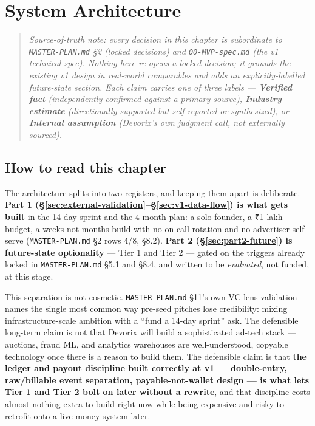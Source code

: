 \chapter{System Architecture}
\label{chap:system-architecture}

\begin{quote}
\textit{Source-of-truth note: every decision in this chapter is subordinate to \texttt{MASTER-PLAN.md} \S2 (locked decisions) and \texttt{00-MVP-spec.md} (the v1 technical spec). Nothing here re-opens a locked decision; it grounds the existing v1 design in real-world comparables and adds an explicitly-labelled future-state section. Each claim carries one of three labels --- \textbf{Verified fact} (independently confirmed against a primary source), \textbf{Industry estimate} (directionally supported but self-reported or synthesized), or \textbf{Internal assumption} (Devorix's own judgment call, not externally sourced).}
\end{quote}

\section{How to read this chapter}
\label{sec:how-to-read}

The architecture splits into two registers, and keeping them apart is deliberate. \textbf{Part 1 (\S\ref{sec:external-validation}--\S\ref{sec:v1-data-flow}) is what gets built} in the 14-day sprint and the 4-month plan: a solo founder, a ₹1 lakh budget, a weeks-not-months build with no on-call rotation and no advertiser self-serve (\texttt{MASTER-PLAN.md} \S2 rows 4/8, \S8.2). \textbf{Part 2 (\S\ref{sec:part2-future}) is future-state optionality} --- Tier 1 and Tier 2 --- gated on the triggers already locked in \texttt{MASTER-PLAN.md} \S5.1 and \S8.4, and written to be \textit{evaluated}, not funded, at this stage.

This separation is not cosmetic. \texttt{MASTER-PLAN.md} \S11's own VC-lens validation names the single most common way pre-seed pitches lose credibility: mixing infrastructure-scale ambition with a ``fund a 14-day sprint'' ask. The defensible long-term claim is not that Devorix will build a sophisticated ad-tech stack --- auctions, fraud ML, and analytics warehouses are well-understood, copyable technology once there is a reason to build them. The defensible claim is that \textbf{the ledger and payout discipline built correctly at v1 --- double-entry, raw/billable event separation, payable-not-wallet design --- is what lets Tier 1 and Tier 2 bolt on later without a rewrite}, and that discipline costs almost nothing extra to build right now while being expensive and risky to retrofit onto a live money system later.

